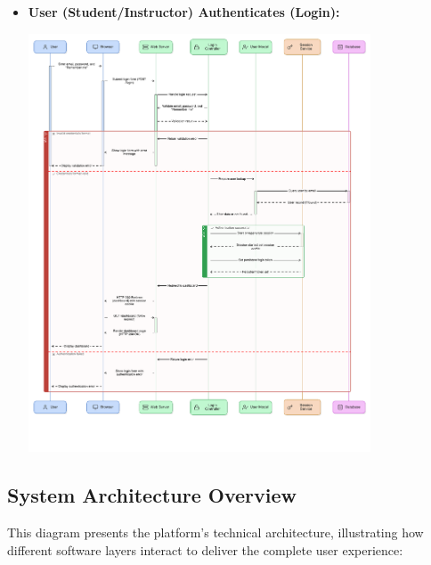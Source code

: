 \documentclass[12pt,a4paper]{article}
\begin{document}
\begin{itemize}
\begin{center}
        \label{fig:instructor-grades-submission}
        \end{center}
    \clearpage
    \item \textbf{User (Student/Instructor) Authenticates (Login):}
    \begin{center}       
        \includegraphics[width=0.8\textwidth,height=0.85\textheight,keepaspectratio]{user-authentication.png}
        \label{fig:user-authentication}
        \end{center}
    \clearpage
\end{itemize}

\subsection{System Architecture Overview}

This diagram presents the platform's technical architecture, illustrating how different software layers interact to deliver the complete user experience:
\end{document}

